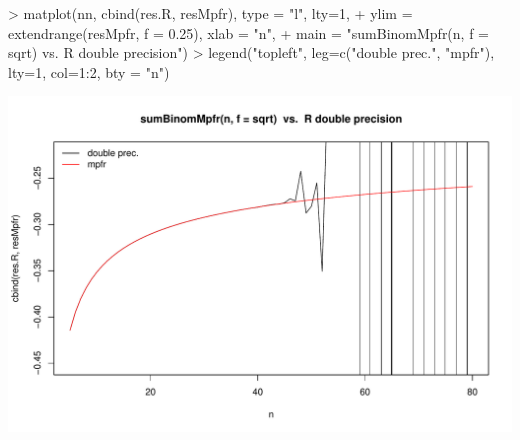 \begin{frame}[fragile]
\begin{Schunk}
\begin{Sinput}
> matplot(nn, cbind(res.R, resMpfr), type = "l", lty=1,
+         ylim = extendrange(resMpfr, f = 0.25), xlab = "n",
+         main = "sumBinomMpfr(n, f = sqrt)  vs.  R double precision")
> legend("topleft", leg=c("double prec.", "mpfr"), lty=1, col=1:2, bty = "n")
\end{Sinput}
\end{Schunk}
\includegraphics{sumBinC-sqrt-ex-2}
\end{frame}

